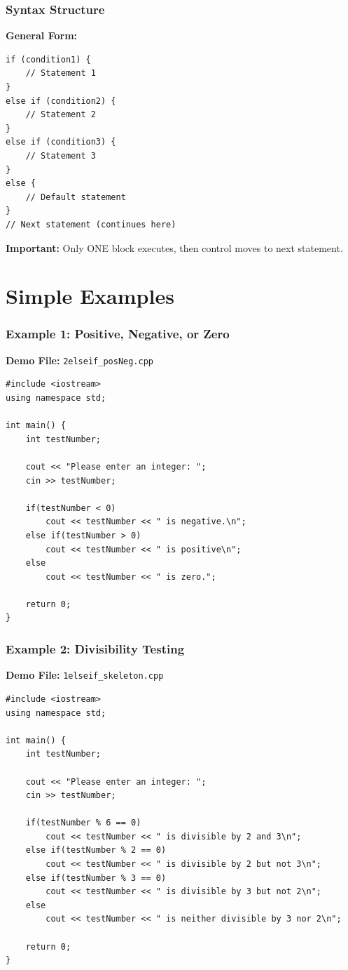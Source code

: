 \documentclass{beamer}
\begin{document}
\begin{frame}[fragile]
\frametitle{Syntax Structure}
\textbf{General Form:}
\begin{verbatim}
if (condition1) {
    // Statement 1
}
else if (condition2) {
    // Statement 2
}
else if (condition3) {
    // Statement 3
}
else {
    // Default statement
}
// Next statement (continues here)
\end{verbatim}

\textbf{Important:} Only ONE block executes, then control moves to next statement.
\end{frame}

\section{Simple Examples}

\begin{frame}[fragile]
\frametitle{Example 1: Positive, Negative, or Zero}
\textbf{Demo File:} \texttt{2elseif\_posNeg.cpp}

\begin{verbatim}
#include <iostream>
using namespace std;

int main() {
    int testNumber;
    
    cout << "Please enter an integer: ";
    cin >> testNumber;
    
    if(testNumber < 0)
        cout << testNumber << " is negative.\n";
    else if(testNumber > 0)
        cout << testNumber << " is positive\n";
    else
        cout << testNumber << " is zero.";
    
    return 0;
}
\end{verbatim}
\end{frame}

\begin{frame}[fragile]
\frametitle{Example 2: Divisibility Testing}
\textbf{Demo File:} \texttt{1elseif\_skeleton.cpp}

\begin{verbatim}
#include <iostream>
using namespace std;

int main() {
    int testNumber;
    
    cout << "Please enter an integer: ";
    cin >> testNumber;
    
    if(testNumber % 6 == 0)
        cout << testNumber << " is divisible by 2 and 3\n";
    else if(testNumber % 2 == 0)
        cout << testNumber << " is divisible by 2 but not 3\n";
    else if(testNumber % 3 == 0)
        cout << testNumber << " is divisible by 3 but not 2\n";
    else
        cout << testNumber << " is neither divisible by 3 nor 2\n";
    
    return 0;
}
\end{verbatim}
\end{frame}
\end{document}
